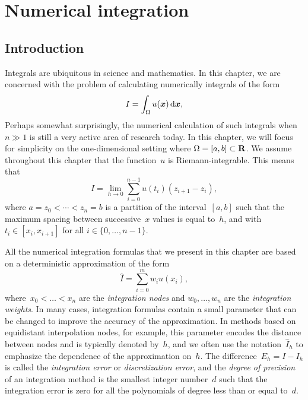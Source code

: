 \chapter{Numerical integration}
\label{cha:quadrature}

\minitoc

\section*{Introduction}
Integrals are ubiquitous in science and mathematics.
In this chapter,
we are concerned with the problem of calculating numerically integrals of the form
\begin{equation}
    \label{eq:integral}
    I = \int_{\Omega} u(\mathbf{\boldsymbol{x}}) \, \mathrm d \mathbf{\boldsymbol{x}},
\end{equation}
Perhaps somewhat surprisingly,
the numerical calculation of such integrals when $n \gg 1$ is still a very active area of research today.
In this chapter,
we will focus for simplicity on the one-dimensional setting where $\Omega = [a, b] \subset \mathbf R$.
We assume throughout this chapter that the function~$u$ is Riemann-integrable.
This means that
\[
    I = \lim_{h \to 0}
    \sum_{i=0}^{n-1} u(t_i) (z_{i+1} - z_i),
\]
where $a = z_0 < \dotsb < z_n = b$ is a partition of the interval~$[a, b]$ such that the maximum spacing between successive~$x$ values is equal to~$h$,
and with $t_i \in [x_i, x_{i+1}]$ for all $i \in \{0, \dotsc, n-1\}$.

All the numerical integration formulas that we present in this chapter are based on a deterministic approximation of the form
\begin{equation}
    \label{eq:deterministic_integration}
    \widehat I = \sum_{i=0}^{m} w_i u(x_i),
\end{equation}
where~$x_0 < \dotsc < x_n$ are the \emph{integration nodes} and $w_0, \dotsc, w_n$ are the \emph{integration weights}.
In many cases, integration formulas contain a small parameter that can be changed to improve the accuracy of the approximation.
In methods based on equidistant interpolation nodes,
for example, this parameter encodes the distance between nodes and is typically denoted by~$h$,
and we often use the notation~$\widehat I_h$ to emphasize the dependence of the approximation on~$h$.
The difference~$E_h = I - I_h$ is called the \emph{integration error} or \emph{discretization error},
and the \emph{degree of precision} of an integration method is the smallest integer number~$d$ such that
the integration error is zero for all the polynomials of degree less than or equal to~$d$.

